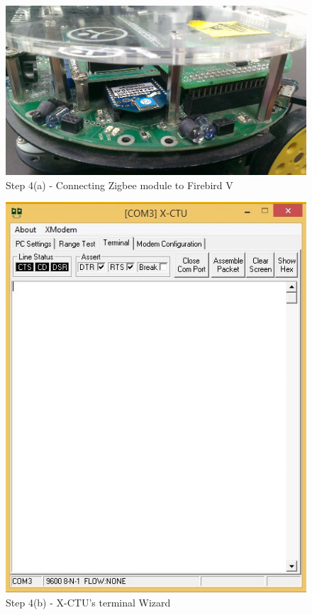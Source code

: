 \begin{flushleft}
\medskip
\begin{figure}[h]
\begin{center}
\includegraphics[scale=0.1]{zigbee_16}
\end{center}
\caption{Step 4(a) - Connecting Zigbee module to Firebird V}
\label{xstep4.1}
\end{figure}
\medskip

\begin{figure}[h]
\begin{center}
\includegraphics[scale=0.5]{zigbee_14}
\end{center}
\caption{Step 4(b) - X-CTU's terminal Wizard}
\label{xstep4.2}
\end{figure}
\medskip


\end{flushleft}
